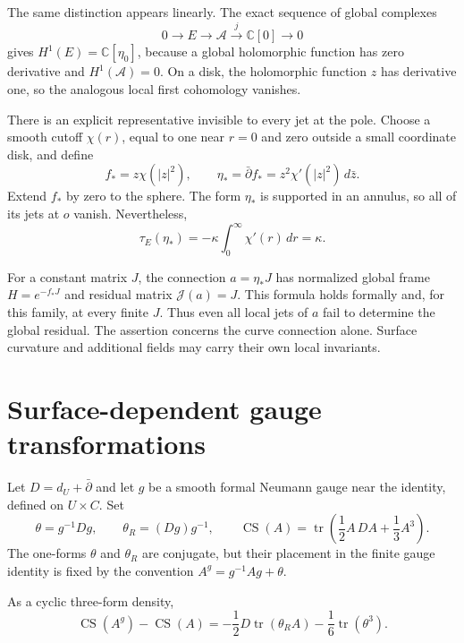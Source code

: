 The same distinction appears linearly. The exact sequence of global
complexes
\[
 0\longrightarrow E\longrightarrow\mathcal A
          \xrightarrow{j}\mathbb C[0]\longrightarrow0
\]
gives $H^1(E)=\mathbb C[\eta_0]$, because a global holomorphic function
has zero derivative and $H^1(\mathcal A)=0$. On a disk, the holomorphic
function $z$ has derivative one, so the analogous local first cohomology
vanishes.

There is an explicit representative invisible to every jet at the
pole. Choose a smooth cutoff $\chi(r)$, equal to one near $r=0$ and
zero outside a small coordinate disk, and define
\begin{equation}\label{mht:eq:annular-residual}
 f_*=z\chi(|z|^2),\qquad
 \eta_*=\bar\partial f_*=z^2\chi'(|z|^2)\,d\bar z.
\end{equation}
Extend $f_*$ by zero to the sphere. The form $\eta_*$ is supported in
an annulus, so all of its jets at $o$ vanish. Nevertheless,
\[
 \tau_E(\eta_*)=-\kappa\int_0^\infty\chi'(r)\,dr=\kappa.
\]

For a constant matrix $J$, the connection $a=\eta_*J$ has normalized
global frame $H=e^{-f_*J}$ and residual matrix $\mathcal J(a)=J$.
This formula holds formally and, for this family, at every finite $J$.
Thus even all local jets of $a$ fail to determine the global residual.
The assertion concerns the curve connection alone. Surface curvature
and additional fields may carry their own local invariants.

\section{Surface-dependent gauge transformations}

Let $D=d_U+\bar\partial$ and let $g$ be a smooth formal Neumann gauge
near the identity, defined on $U\times C$. Set
\[
 \theta=g^{-1}Dg,\qquad \theta_R=(Dg)g^{-1},\qquad
 \operatorname{CS}(A)=\operatorname{tr}
                \left(\frac12 A\,DA+\frac13A^3\right).
\]
The one-forms $\theta$ and $\theta_R$ are conjugate, but their placement
in the finite gauge identity is fixed by the convention
$A^g=g^{-1}Ag+\theta$.

\begin{lemma}\label{mht:lem:finite-transgression}
As a cyclic three-form density,
\begin{equation}\label{mht:eq:finite-transgression}
 \operatorname{CS}(A^g)-\operatorname{CS}(A)
   =-\frac12D\operatorname{tr}(\theta_RA)
                       -\frac16\operatorname{tr}(\theta^3).
\end{equation}
\end{lemma}

